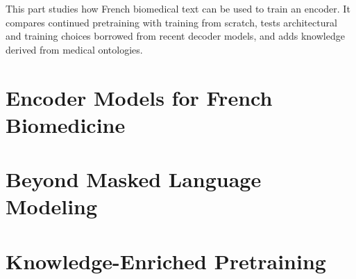 
This part studies how French biomedical text can be used to train an encoder. It
compares continued pretraining with training from scratch, tests architectural and
training choices borrowed from recent decoder models, and adds knowledge derived
from medical ontologies.

\chapter{Encoder Models for French Biomedicine}
\label{chap:encoders}


\chapter{Beyond Masked Language Modeling}
\label{chap:objectives}


\chapter{Knowledge-Enriched Pretraining}
\label{chap:ontobook}

